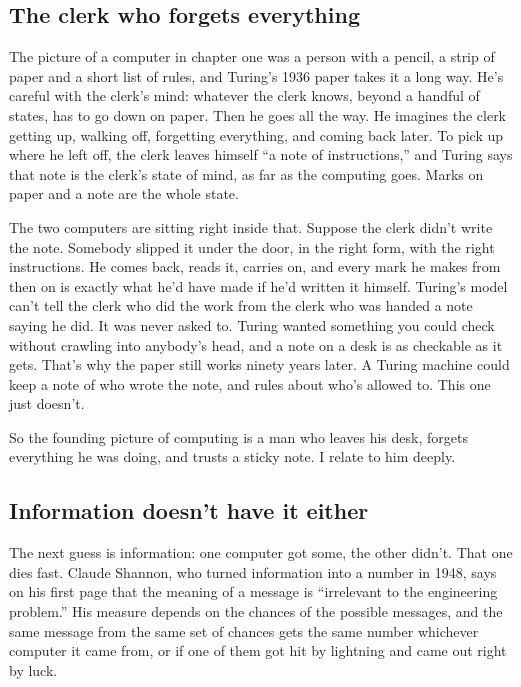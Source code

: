 \documentclass[11pt,twoside]{article}
\theoremstyle{thielethm}
\theoremstyle{thieledef}
\theoremstyle{thieledef}
\theoremstyle{thieledef}
\theoremstyle{thielethm}
\theoremstyle{thieleobs}
\theoremstyle{thielethm}
\begin{document}
\subsection{The clerk who forgets everything}

The picture of a computer in chapter one was a person with a pencil, a strip of paper and a short list of rules, and Turing's 1936 paper takes it a long way. He's careful with the clerk's mind: whatever the clerk knows, beyond a handful of states, has to go down on paper. Then he goes all the way. He imagines the clerk getting up, walking off, forgetting everything, and coming back later. To pick up where he left off, the clerk leaves himself ``a note of instructions,'' and Turing says that note is the clerk's state of mind, as far as the computing goes. Marks on paper and a note are the whole state.

The two computers are sitting right inside that. Suppose the clerk didn't write the note. Somebody slipped it under the door, in the right form, with the right instructions. He comes back, reads it, carries on, and every mark he makes from then on is exactly what he'd have made if he'd written it himself. Turing's model can't tell the clerk who did the work from the clerk who was handed a note saying he did. It was never asked to. Turing wanted something you could check without crawling into anybody's head, and a note on a desk is as checkable as it gets. That's why the paper still works ninety years later. A Turing machine could keep a note of who wrote the note, and rules about who's allowed to. This one just doesn't.

So the founding picture of computing is a man who leaves his desk, forgets everything he was doing, and trusts a sticky note. I relate to him deeply.

\subsection{Information doesn't have it either}

The next guess is information: one computer got some, the other didn't. That one dies fast. Claude Shannon, who turned information into a number in 1948, says on his first page that the meaning of a message is ``irrelevant to the engineering problem.'' His measure depends on the chances of the possible messages, and the same message from the same set of chances gets the same number whichever computer it came from, or if one of them got hit by lightning and came out right by luck.
\end{document}
